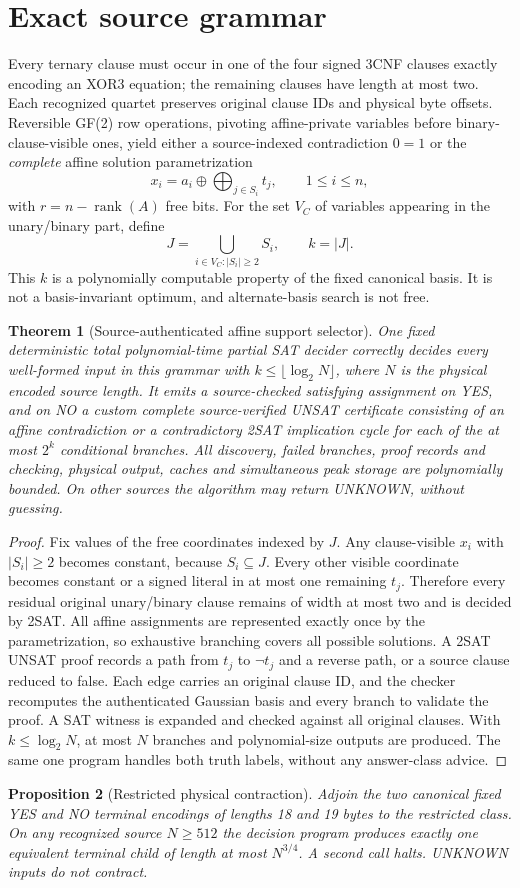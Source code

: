 \documentclass[11pt]{article}
\newtheorem{theorem}{Theorem}
\newtheorem{proposition}[theorem]{Proposition}
\begin{document}
\section{Exact source grammar}
Every ternary clause must occur in one of the four signed 3CNF clauses exactly encoding an XOR3 equation; the remaining clauses have length at most two. Each recognized quartet preserves original clause IDs and physical byte offsets. Reversible GF(2) row operations, pivoting affine-private variables before binary-clause-visible ones, yield either a source-indexed contradiction $0=1$ or the \emph{complete} affine solution parametrization
\[
 x_i=a_i\oplus\bigoplus_{j\in S_i}t_j,\qquad 1\le i\le n,
\]
with $r=n-\operatorname{rank}(A)$ free bits. For the set $V_C$ of variables appearing in the unary/binary part, define
\[
 J=\bigcup_{i\in V_C:|S_i|\ge2}S_i,\qquad k=|J|.
\]
This $k$ is a polynomially computable property of the fixed canonical basis. It is not a basis-invariant optimum, and alternate-basis search is not free.
\begin{theorem}[Source-authenticated affine support selector]
One fixed deterministic total polynomial-time \emph{partial} SAT decider correctly decides every well-formed input in this grammar with $k\le\lfloor\log_2N\rfloor$, where $N$ is the physical encoded source length. It emits a source-checked satisfying assignment on YES, and on NO a custom complete source-verified UNSAT certificate consisting of an affine contradiction or a contradictory 2SAT implication cycle for each of the at most $2^k$ conditional branches. All discovery, failed branches, proof records and checking, physical output, caches and simultaneous peak storage are polynomially bounded. On other sources the algorithm may return UNKNOWN, without guessing.
\end{theorem}
\begin{proof}
Fix values of the free coordinates indexed by $J$. Any clause-visible $x_i$ with $|S_i|\ge2$ becomes constant, because $S_i\subseteq J$. Every other visible coordinate becomes constant or a signed literal in at most one remaining $t_j$. Therefore every residual original unary/binary clause remains of width at most two and is decided by 2SAT. All affine assignments are represented exactly once by the parametrization, so exhaustive branching covers all possible solutions. A 2SAT UNSAT proof records a path from $t_j$ to $\neg t_j$ and a reverse path, or a source clause reduced to false. Each edge carries an original clause ID, and the checker recomputes the authenticated Gaussian basis and every branch to validate the proof. A SAT witness is expanded and checked against all original clauses. With $k\le\log_2N$, at most $N$ branches and polynomial-size outputs are produced. The same one program handles both truth labels, without any answer-class advice.
\end{proof}
\begin{proposition}[Restricted physical contraction]
Adjoin the two canonical fixed YES and NO terminal encodings of lengths 18 and 19 bytes to the restricted class. On any recognized source $N\ge512$ the decision program produces exactly one equivalent terminal child of length at most $N^{3/4}$. A second call halts. UNKNOWN inputs do not contract.
\end{proposition}
\end{document}
